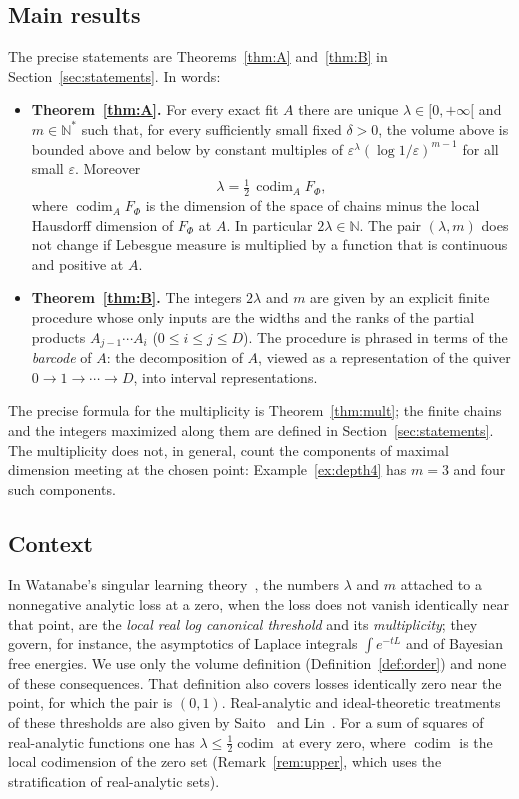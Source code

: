 \documentclass[11pt,a4paper]{article}
\theoremstyle{definition}
\theoremstyle{remark}
\numberwithin{equation}{section}
\newcommand{\N}{\mathbb{N}}
\newcommand{\codim}{\operatorname{codim}}
\newcommand{\eps}{\varepsilon}
\begin{document}
\subsection{Main results}
The precise statements are Theorems~\ref{thm:A} and~\ref{thm:B} in Section~\ref{sec:statements}. In words:

\begin{itemize}
\item \textbf{Theorem~\ref{thm:A}.} For every exact fit $A$ there are unique $\lambda\in[0,+\infty[$ and $m\in\N^*$ such that, for every sufficiently small fixed $\delta>0$, the volume above is bounded above and below by constant multiples of $\eps^{\lambda}(\log1/\eps)^{m-1}$ for all small $\eps$. Moreover
\[
\lambda=\tfrac12\,\codim_AF_\Phi,
\]
where $\codim_AF_\Phi$ is the dimension of the space of chains minus the local Hausdorff dimension of $F_\Phi$ at $A$. In particular $2\lambda\in\N$. The pair $(\lambda,m)$ does not change if Lebesgue measure is multiplied by a function that is continuous and positive at $A$.
\item \textbf{Theorem~\ref{thm:B}.} The integers $2\lambda$ and $m$ are given by an explicit finite procedure whose only inputs are the widths and the ranks of the partial products $A_{j-1}\cdots A_i$ ($0\le i\le j\le D$). The procedure is phrased in terms of the \emph{barcode} of $A$: the decomposition of $A$, viewed as a representation of the quiver $0\to1\to\cdots\to D$, into interval representations.
\end{itemize}

The precise formula for the multiplicity is Theorem~\ref{thm:mult}; the finite chains and the integers maximized along them are defined in Section~\ref{sec:statements}. The multiplicity does not, in general, count the components of maximal dimension meeting at the chosen point: Example~\ref{ex:depth4} has $m=3$ and four such components.

\subsection{Context}
In Watanabe's singular learning theory~\cite{watanabe-book,watanabe-2018}, the numbers $\lambda$ and $m$ attached to a nonnegative analytic loss at a zero, when the loss does not vanish identically near that point, are the \emph{local real log canonical threshold} and its \emph{multiplicity}; they govern, for instance, the asymptotics of Laplace integrals $\int e^{-tL}$ and of Bayesian free energies. We use only the volume definition (Definition~\ref{def:order}) and none of these consequences. That definition also covers losses identically zero near the point, for which the pair is $(0,1)$. Real-analytic and ideal-theoretic treatments of these thresholds are also given by Saito~\cite{saito} and Lin~\cite{lin}. For a sum of squares of real-analytic functions one has $\lambda\le\frac12\codim$ at every zero, where $\codim$ is the local codimension of the zero set (Remark~\ref{rem:upper}, which uses the stratification of real-analytic sets).
\end{document}
